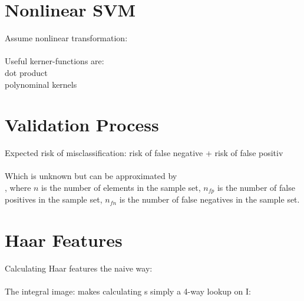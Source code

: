 \documentclass[a4paper,12pt,pdftex]{scrreprt}
\begin{document}
	\section{Nonlinear SVM} %
	\label{sec:nonlinear_svm}
	Assume nonlinear transformation:\\
	\\
	Useful kerner-functions are:\\
	 dot product\\
	 polynominal kernels\\

	\section{Validation Process} %
	\label{sec:validation_process}
	Expected risk of misclassification: risk of false negative + risk of false positiv\\
	\\
	Which is unknown but can be approximated by\\
	, where $n$ is the number of elements in the sample set, $n_{fp}$ is the number of false positives in the sample set, $n_{fn}$ is the number of false negatives in the sample set.

	\section{Haar Features} %
	\label{sec:haar_features}
	Calculating Haar features the naive way:\\
	\\
	The integral image: makes calculating s simply a 4-way lookup on I:\\
\end{document}
